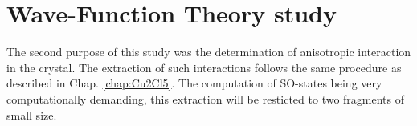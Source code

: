 \documentclass[12pt]{report}
\numberwithin{equation}{section}
\begin{document}



\section{Wave-Function Theory study}

The second purpose of this study was the determination of anisotropic interaction in the crystal.
The extraction of such interactions follows the same procedure as described in Chap. \ref{chap:Cu2Cl5}.
The computation of SO-states being very computationally demanding, this extraction will be resticted to two fragments of small size.
\end{document}
